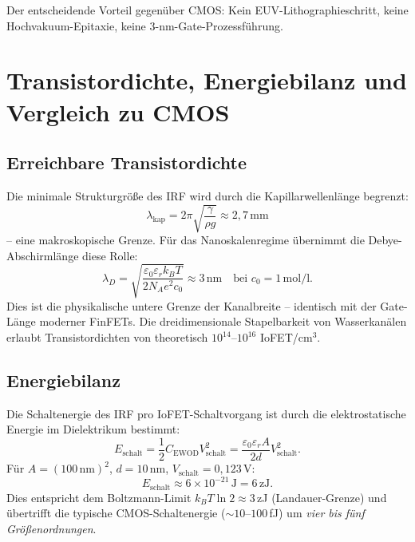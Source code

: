 ﻿\documentclass[a4paper,12pt]{scrreprt}
\theoremstyle{definition}
\begin{document}
Der entscheidende Vorteil gegenüber CMOS: Kein EUV-Lithographieschritt,
keine Hochvakuum-Epitaxie, keine 3-nm-Gate-Prozessführung.

\section{Transistordichte, Energiebilanz und Vergleich zu CMOS}

\subsection{Erreichbare Transistordichte}

Die minimale Strukturgröße des IRF wird durch die Kapillarwellenlänge
begrenzt:
\begin{equation}
  \lambda_{\mathrm{kap}} = 2\pi \sqrt{\frac{\gamma}{\rho g}} \approx 2{,}7\,\text{mm}
\end{equation}
-- eine makroskopische Grenze. Für das Nanoskalenregime übernimmt die
Debye-Abschirm\-länge diese Rolle:
\begin{equation}
  \lambda_D = \sqrt{\frac{\varepsilon_0 \varepsilon_r k_B T}{2 N_A e^2 c_0}} \approx 3\,\text{nm}
  \quad\text{bei } c_0 = 1\,\text{mol/l}.
\end{equation}
Dies ist die physikalische untere Grenze der Kanalbreite -- identisch mit
der Gate-Länge moderner FinFETs. Die dreidimensionale Stapelbarkeit von
Wasserkanälen erlaubt Transistordichten von theoretisch $10^{14}$--$10^{16}$
IoFET/cm$^3$.

\subsection{Energiebilanz}

Die Schaltenergie des IRF pro IoFET-Schaltvorgang ist durch die
elektrostatische Energie im Dielektrikum bestimmt:
\begin{equation}
  E_{\mathrm{schalt}} = \frac{1}{2} C_{\mathrm{EWOD}} V_{\mathrm{schalt}}^2
  = \frac{\varepsilon_0 \varepsilon_r A}{2d} V_{\mathrm{schalt}}^2.
\end{equation}
Für $A = (100\,\text{nm})^2$, $d = 10$\,nm, $V_{\mathrm{schalt}} = 0{,}123$\,V:
\begin{equation}
  E_{\mathrm{schalt}} \approx 6 \times 10^{-21}\,\text{J} = 6\,\text{zJ}.
\end{equation}
Dies entspricht dem Boltzmann-Limit $k_B T \ln 2 \approx 3$\,zJ
(Landauer-Grenze) und übertrifft die typische CMOS-Schaltenergie
($\sim 10$--$100$\,fJ) um \emph{vier bis fünf Größenordnungen}.
\end{document}
